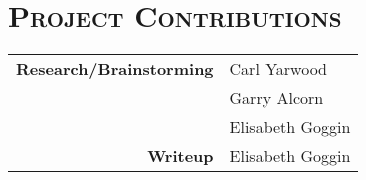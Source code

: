 \documentclass[12pt]{article}
\begin{document}
	\section[Project Contributions]{\Large{}\selectfont\scshape Project Contributions}
	
	\begin{center}
		{\scshape\small
		\begin{tabular}{r l}
			\bfseries Research/Brainstorming & Carl Yarwood\\
			& Garry Alcorn\\
			& Elisabeth Goggin\\
			\bfseries Writeup & Elisabeth Goggin\\
		\end{tabular}
		}
	\end{center}
	
\end{document}
